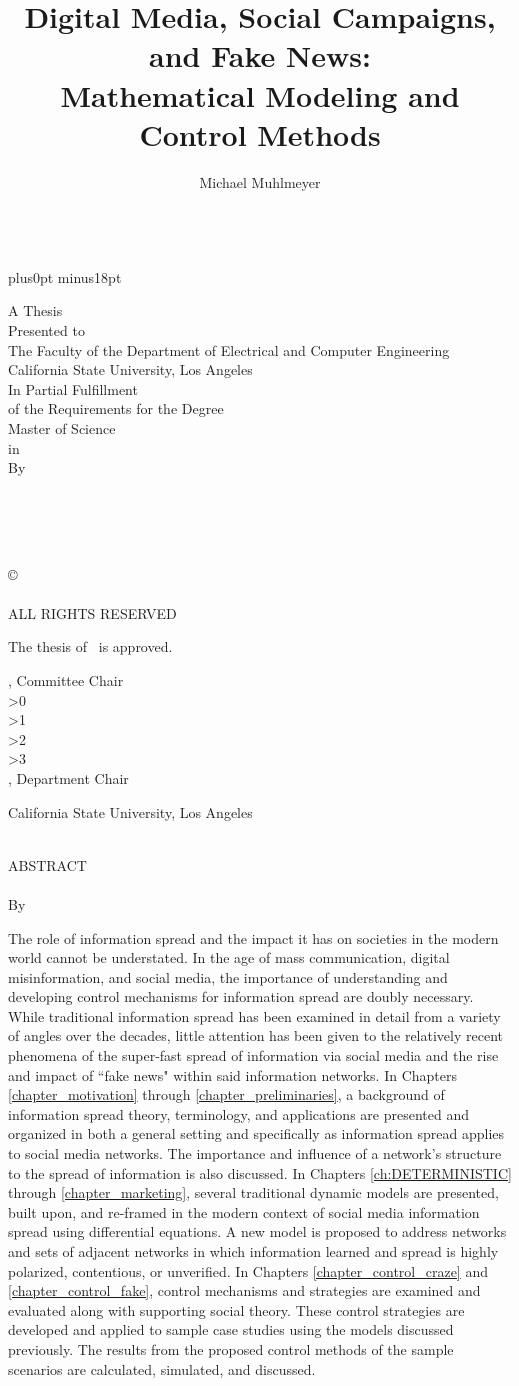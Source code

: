 \documentclass[12pt,openany,oneside]{book}
\author{Michael Muhlmeyer}%
\title{Digital Media, Social Campaigns, and Fake News:\\Mathematical Modeling and Control Methods}%
\makeatletter
\theoremstyle{definition}
\newcounter{members}%
\newcommand{\maketitlepage}{
\thispagestyle{empty}
\begin {center}
\uppercase{{\expandafter\expandafter\expandafter\uppercase\expandafter{\@title}}}\\%
\vskip 48pt plus0pt minus18pt

\normalsize \rm A Thesis\\
Presented to\\
The Faculty of the Department of Electrical and Computer Engineering\\
California State University, Los Angeles\\
\vfill        
In Partial Fulfillment \\
of the Requirements for the Degree \\
Master of Science  \\
in\\
\@department
\vfill
By\\    
\@author \\
\@month\ \@year
\end {center}
\vspace{.5in} %
}
\newcommand{\makecopyright}{
\newpage
\ \vfill
\begin{center}
        \copyright~\@year \\
        \@author\\
        ALL RIGHTS RESERVED
\end{center}}
\newcommand{\makeapprovalpage}{
\newpage
The thesis of \@author\ is approved.

\begin{center}
\@committeechair, Committee Chair\\
\ifnum\c@members>0 \@memberA\\\fi
\ifnum\c@members>1 \@memberB\\\fi
\ifnum\c@members>2 \@memberC\\\fi
\ifnum\c@members>3 \@memberD\\\fi
\@departmentchair, Department Chair\\

\vspace{1in}

California State University, Los Angeles\\
\@month\ \@year
\end{center}
}
\newcommand{\makeabstract}{
\newpage
\addcontentsline{toc}{part}{Abstract}
\begin{center}
ABSTRACT\\
        \@title\\
        By\\
        \@author
\end{center}
\par}
\makeatother
\begin{document}

\frontmatter%
\maketitlepage


\makecopyright


\makeapprovalpage


\makeabstract

The role of information spread and the impact it has on societies in the modern world cannot be understated. In the age of mass communication, digital misinformation, and social media, the importance of understanding and developing control mechanisms for information spread are doubly necessary. While traditional information spread has been examined in detail from a variety of angles over the decades, little attention has been given to the relatively recent phenomena of the super-fast spread of information via social media and the rise and impact of ``fake news" within said information networks. In Chapters \ref{chapter_motivation} through \ref{chapter_preliminaries}, a background of information spread theory, terminology, and applications are presented and organized in both a general setting and specifically as information spread applies to social media networks. The importance and influence of a network's structure to the spread of information is also discussed. In Chapters \ref{ch:DETERMINISTIC} through \ref{chapter_marketing}, several traditional dynamic models are presented, built upon, and re-framed in the modern context of social media information spread using differential equations. A new model is proposed to address networks and sets of adjacent networks in which information learned and spread is highly polarized, contentious, or unverified. In Chapters \ref{chapter_control_craze} and \ref{chapter_control_fake}, control mechanisms and strategies are examined and evaluated along with supporting social theory. These control strategies are developed and applied to sample case studies using the models discussed previously. The results from the proposed control methods of the sample scenarios are calculated, simulated, and discussed.
\end{document}
